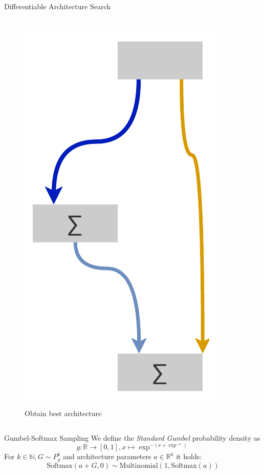 \documentclass[]{beamer}
\begin{document}
\begin{frame}{Differentiable Architecture Search}
\begin{columns}
\begin{column}{.35\textwidth}
\begin{figure}
	\includegraphics[scale=0.4, center]{graphics/darts_3.pdf}
	\caption{Obtain best architecture}
\end{figure}
\end{column}
\end{columns}
\end{frame}

\begin{frame}{Gumbel-Softmax Sampling}
\vspace{10pt}
We define the \textit{Standard Gumbel} probability density as
\begin{equation*}
g:\mathbb{R}\rightarrow [0,1],x\mapsto \exp^{-(x+\exp^{-x})}
\end{equation*}
For $k\in\mathbb{N}, G\sim P^k_g$ and architecture parameters $a\in\mathbb{R}^k$ it holds:
\begin{equation*}
\text{Softmax}(a + G, 0)\sim \text{Multinomial}(1, \text{Softmax}(a))
\end{equation*}
\end{frame}
\end{document}
